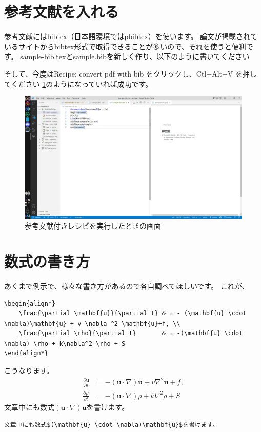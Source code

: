 \documentclass[twocolumn]{jarticle}
\begin{document}
\section{参考文献を入れる}
参考文献にはbibtex（日本語環境ではpbibtex）を使います。
論文が掲載されているサイトからbibtex形式で取得できることが多いので、それを使うと便利です。
sample-bib.texとsample.bibを新しく作り、以下のように書いてください


そして、今度はRecipe: convert pdf with bib をクリックし、Ctl+Alt+V を押してください
\ref{run-recipe-with-bib}のようになっていれば成功です。
\begin{figure}[b]
    \centering
    \includegraphics[keepaspectratio, scale=0.1]{run-recipe-with-bib.jpg}
    \caption{参考文献付きレシピを実行したときの画面}
    \label{run-recipe-with-bib}
\end{figure}

\section{数式の書き方}
あくまで例示で、様々な書き方があるので各自調べてほしいです。
これが、
\begin{lstlisting}
\begin{align*}
    \frac{\partial \mathbf{u}}{\partial t} & = - (\mathbf{u} \cdot \nabla)\mathbf{u} + v \nabla ^2 \mathbf{u}+f, \\
    \frac{\partial \rho}{\partial t}       & = -(\mathbf{u} \cdot \nabla) \rho + k\nabla^2 \rho + S
\end{align*}
\end{lstlisting}
こうなります。
\begin{align*}
    \frac{\partial \mathbf{u}}{\partial t} & = - (\mathbf{u} \cdot \nabla)\mathbf{u} + v \nabla ^2 \mathbf{u}+f, \\
    \frac{\partial \rho}{\partial t}       & = -(\mathbf{u} \cdot \nabla) \rho + k\nabla^2 \rho + S
\end{align*}
文章中にも数式$(\mathbf{u} \cdot \nabla)\mathbf{u}$を書けます。
\begin{lstlisting}
文章中にも数式$(\mathbf{u} \cdot \nabla)\mathbf{u}$を書けます。
\end{lstlisting}
\end{document}
